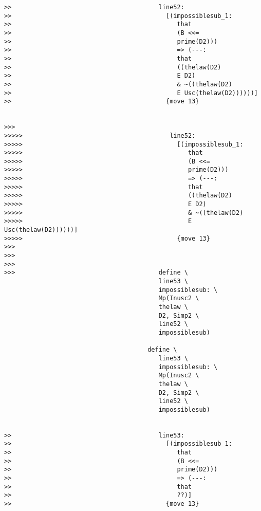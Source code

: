 \documentclass[12pt]{article}
\begin{document}
\begin{verbatim}
>>                                        line52:
>>                                          [(impossiblesub_1:
>>                                             that
>>                                             (B <<=
>>                                             prime(D2)))
>>                                             => (---:
>>                                             that
>>                                             ((thelaw(D2)
>>                                             E D2)
>>                                             & ~((thelaw(D2)
>>                                             E Usc(thelaw(D2))))))]
>>                                          {move 13}


>>>
>>>>>                                        line52:
>>>>>                                          [(impossiblesub_1:
>>>>>                                             that
>>>>>                                             (B <<=
>>>>>                                             prime(D2)))
>>>>>                                             => (---:
>>>>>                                             that
>>>>>                                             ((thelaw(D2)
>>>>>                                             E D2)
>>>>>                                             & ~((thelaw(D2)
>>>>>                                             E Usc(thelaw(D2))))))]
>>>>>                                          {move 13}
>>>
>>>
>>>
>>>                                       define \
                                          line53 \
                                          impossiblesub: \
                                          Mp(Inusc2 \
                                          thelaw \
                                          D2, Simp2 \
                                          line52 \
                                          impossiblesub)

                                       define \
                                          line53 \
                                          impossiblesub: \
                                          Mp(Inusc2 \
                                          thelaw \
                                          D2, Simp2 \
                                          line52 \
                                          impossiblesub)


>>                                        line53:
>>                                          [(impossiblesub_1:
>>                                             that
>>                                             (B <<=
>>                                             prime(D2)))
>>                                             => (---:
>>                                             that
>>                                             ??)]
>>                                          {move 13}



\end{verbatim}
\end{document}
